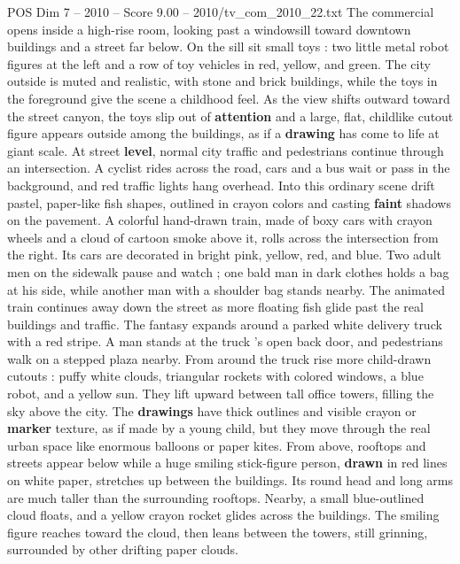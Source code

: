 \begin{textsample}{POS Dim 7 – 2010 – Score 9.00 – 2010/tv\_com\_2010\_22.txt}  \label{ex:f7_pos_051}
The commercial opens inside a high-rise room, looking past a windowsill toward downtown buildings and a street far below.
On the sill sit small toys : two little metal robot figures at the left and a row of toy vehicles in red, yellow, and green.
The city outside is muted and realistic, with stone and brick buildings, while the toys in the foreground give the scene a childhood feel.
As the view shifts outward toward the street canyon, the toys slip out of \textbf{attention} and a large, flat, childlike cutout figure appears outside among the buildings, as if a \textbf{drawing} has come to life at giant scale.
At street \textbf{level}, normal city traffic and pedestrians continue through an intersection.
A cyclist rides across the road, cars and a bus wait or pass in the background, and red traffic lights hang overhead.
Into this ordinary scene drift pastel, paper-like fish shapes, outlined in crayon colors and casting \textbf{faint} shadows on the pavement.
A colorful hand-drawn train, made of boxy cars with crayon wheels and a cloud of cartoon smoke above it, rolls across the intersection from the right.
Its cars are decorated in bright pink, yellow, red, and blue.
Two adult men on the sidewalk pause and watch ; one bald man in dark clothes holds a bag at his side, while another man with a shoulder bag stands nearby.
The animated train continues away down the street as more floating fish glide past the real buildings and traffic.
The fantasy expands around a parked white delivery truck with a red stripe.
A man stands at the truck ’s open back door, and pedestrians walk on a stepped plaza nearby.
From around the truck rise more child-drawn cutouts : puffy white clouds, triangular rockets with colored windows, a blue robot, and a yellow sun.
They lift upward between tall office towers, filling the sky above the city.
The \textbf{drawings} have thick outlines and visible crayon or \textbf{marker} texture, as if made by a young child, but they move through the real urban space like enormous balloons or paper kites.
From above, rooftops and streets appear below while a huge smiling stick-figure person, \textbf{drawn} in red lines on white paper, stretches up between the buildings.
Its round head and long arms are much taller than the surrounding rooftops.
Nearby, a small blue-outlined cloud floats, and a yellow crayon rocket glides across the buildings.
The smiling figure reaches toward the cloud, then leans between the towers, still grinning, surrounded by other drifting paper clouds.

\end{textsample}
